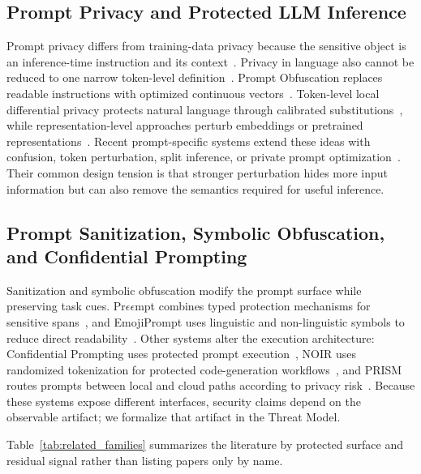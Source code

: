 \documentclass[letterpaper]{article} %
\begin{document}
\subsection{Prompt Privacy and Protected LLM Inference}

Prompt privacy differs from training-data privacy because the sensitive object is an inference-time instruction and its context~\citep{edemacu2024privacy}.  Privacy in language also cannot be reduced to one narrow token-level definition~\citep{brown2022privacymeaning}.  Prompt Obfuscation replaces readable instructions with optimized continuous vectors~\citep{pape2025promptobfuscation}.  Token-level local differential privacy protects natural language through calibrated substitutions~\citep{yue2021santext,chen2023custext}, while representation-level approaches perturb embeddings or pretrained representations~\citep{qu2021privacybert,zhou2023textobfuscator}.  Recent prompt-specific systems extend these ideas with confusion, token perturbation, split inference, or private prompt optimization~\citep{mai2026confusionprompt,tong2025inferdpt,mai2024split,hong2024dpopt}.  Their common design tension is that stronger perturbation hides more input information but can also remove the semantics required for useful inference.

\subsection{Prompt Sanitization, Symbolic Obfuscation, and Confidential Prompting}

Sanitization and symbolic obfuscation modify the prompt surface while preserving task cues.  Pr$\epsilon\epsilon$mpt combines typed protection mechanisms for sensitive spans~\citep{chowdhury2025preempt}, and EmojiPrompt uses linguistic and non-linguistic symbols to reduce direct readability~\citep{lin2024emojiprompt}.  Other systems alter the execution architecture: Confidential Prompting uses protected prompt execution~\citep{lee2024confidential}, NOIR uses randomized tokenization for protected code-generation workflows~\citep{nguyen2026noir}, and PRISM routes prompts between local and cloud paths according to privacy risk~\citep{zhan2026prism}.  Because these systems expose different interfaces, security claims depend on the observable artifact; we formalize that artifact in the Threat Model.

Table~\ref{tab:related_families} summarizes the literature by protected surface and residual signal rather than listing papers only by name.
\end{document}
